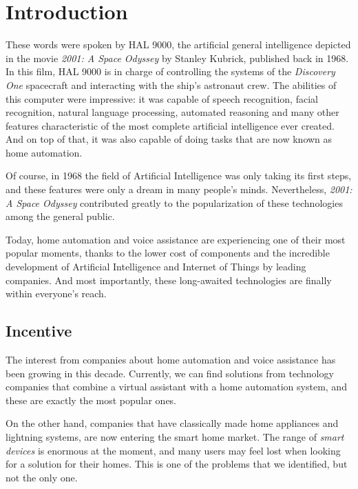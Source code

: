 \chapter{Introduction}


These words were spoken by HAL 9000, the artificial general intelligence depicted in the movie \textit{2001: A Space Odyssey}
by Stanley Kubrick, published back in 1968. In this film, HAL 9000 is in charge of controlling the systems of the
\textit{Discovery One} spacecraft and interacting with the ship's astronaut crew. The abilities of this computer were impressive: it
was capable of speech recognition, facial recognition, natural language processing, automated reasoning and many other features
characteristic of the most complete artificial intelligence ever created. And on top  of that, it was also capable of doing tasks
that are now known as home automation.

Of course, in 1968 the field of Artificial Intelligence was only taking its first steps, and these features were only a dream in many
people's minds. Nevertheless, \textit{2001: A Space Odyssey} contributed greatly to the popularization of these technologies among
the general public.

Today, home automation and voice assistance are experiencing one of their most popular moments, thanks to the lower cost of components
and the incredible development of Artificial Intelligence and Internet of Things by leading companies. And most importantly, these
long-awaited technologies are finally within everyone's reach.

\section{Incentive}
The interest from companies about home automation and voice assistance has been growing in this decade. Currently, we can find
solutions from technology companies that combine a virtual assistant with a home automation system, and these are exactly the most
popular ones.

On the other hand, companies that have classically made home appliances and lightning systems, are now entering the smart home market.
The range of \textit{smart devices} is enormous at the moment, and many users may feel lost when looking for a solution for their homes.
This is one of the problems that we identified, but not the only one.

